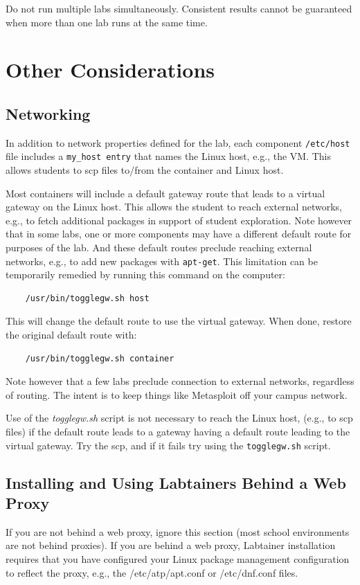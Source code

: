 \documentclass[12pt]{article}
\begin{document}
Do not run multiple labs simultaneously.  Consistent results cannot be guaranteed when more than one lab runs at the same time.

\section{Other Considerations}
\subsection{Networking}
In addition to network properties defined for the lab,
each component \texttt{/etc/host} file includes a {\tt my\_host entry} that names
the Linux host, e.g., the VM.  This allows students to scp files to/from the container and Linux host.

Most containers will include a default gateway route that
leads to a virtual gateway on the Linux host.  This allows the student to reach external networks, e.g., to 
fetch additional packages in support of student exploration.  Note however that in some labs, one or 
more components may have a different default route for purposes of the lab.  And these default routes preclude
reaching external networks, e.g., to add new packages with {\tt apt-get}.  This limitation can be temporarily 
remedied by running this command on the computer:
\begin{verbatim}
    /usr/bin/togglegw.sh host
\end{verbatim}
\noindent This will change the default route to use the virtual gateway.  When done, restore the original
default route with:
\begin{verbatim}
    /usr/bin/togglegw.sh container
\end{verbatim}
Note however that a few labs preclude connection to external networks, regardless of routing.  The intent is to keep things
like Metasploit off your campus network.

Use of the \textit{togglegw.sh} script is not necessary to reach the Linux host, (e.g., to scp files) 
if the default route leads to a gateway having a default route leading to the virtual gateway.  Try the scp, and
if it fails try using the {\tt togglegw.sh} script.

\subsection{Installing and Using Labtainers Behind a Web Proxy}
If you are not behind a web proxy, ignore this section (most school environments
are not behind proxies). 
If you are behind a web proxy, Labtainer installation
requires that you have configured your Linux package management configuration to reflect
the proxy, e.g., the /etc/atp/apt.conf or /etc/dnf.conf files.  
\end{document}
